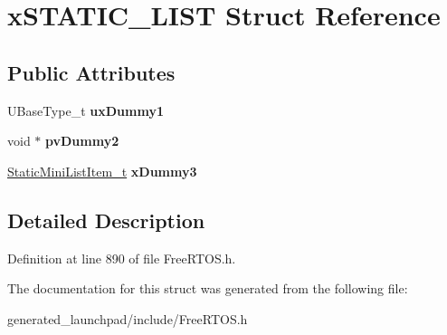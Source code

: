 \hypertarget{structxSTATIC__LIST}{}\section{x\+S\+T\+A\+T\+I\+C\+\_\+\+L\+I\+ST Struct Reference}
\label{structxSTATIC__LIST}
\subsection*{Public Attributes}
\begin{DoxyCompactItemize}
\item 
\mbox{\label{structxSTATIC__LIST_a6d7f720dc21e3a676b885b72a945fea7}} 
U\+Base\+Type\+\_\+t {\bfseries ux\+Dummy1}
\item 
\mbox{\label{structxSTATIC__LIST_a681e588716be5f49fe8e9eb73e8f280e}} 
void $\ast$ {\bfseries pv\+Dummy2}
\item 
\mbox{\label{structxSTATIC__LIST_a232545ebb5629617e0ee6ba286e37788}} 
\mbox{\hyperlink{structxSTATIC__MINI__LIST__ITEM}{Static\+Mini\+List\+Item\+\_\+t}} {\bfseries x\+Dummy3}
\end{DoxyCompactItemize}


\subsection{Detailed Description}


Definition at line 890 of file Free\+R\+T\+O\+S.\+h.



The documentation for this struct was generated from the following file\+:\begin{DoxyCompactItemize}
\item 
generated\+\_\+launchpad/include/Free\+R\+T\+O\+S.\+h\end{DoxyCompactItemize}
